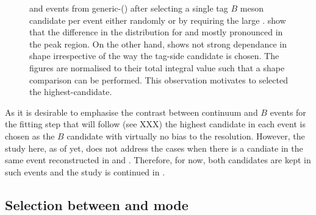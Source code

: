 \begin{figure}[htbp!]
{    and \mbox{\epem\ra\qqbar} events from generic-\MC () after selecting a single tag $B$ meson candidate per event either randomly or by requiring the large \feiProb.
     show that the difference in the \Mbc distribution for \BptoXsgamma and \BztoXsgamma mostly pronounced in the peak region.
    On the other hand,  shows not strong dependance in shape irrespective of the way the tag-side candidate is chosen.
    The figures are normalised to their total integral value such that a shape comparison can be performed.
    This observation motivates to selected the highest-\feiProb candidate.
    }    
\end{figure}

As it is desirable to emphasise the contrast between continuum and $B$ events for the fitting step that will follow (see XXX)
the highest \feiProb candidate in each event is chosen as the $B$ candidate with virtually no bias to the resolution.
However, the study here, as of yet, does not address the cases when there is a candiate in the same event reconstructed in \feiBp and \feiBz.
Therefore, for now, both candidates are kept in such events and the study is continued in .

\subsection{Selection between \texorpdfstring{\feiBp}{feiB+} and \texorpdfstring{\feiBz}{feiB0} mode}\label{sec:select_best_candidate}

